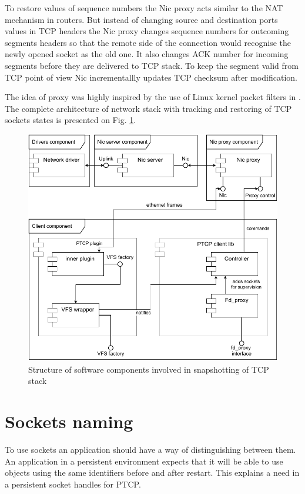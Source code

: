 To restore values of sequence numbers the Nic proxy acts similar to the NAT
mechanism in routers. But instead of changing source and destination ports
values in TCP headers the Nic proxy changes sequence numbers for outcoming
segments headers so that the remote side of the connection would recognise the
newly opened socket as the old one. It also changes ACK number for incoming
segments before they are delivered to TCP stack. To keep the segment valid from
TCP point of view Nic incrementallly updates TCP checksum after modification. 

The idea of proxy was highly inspired by the use of Linux kernel packet filters
in \cite{rocks_racks}. The complete architecture of network stack with tracking
and restoring of TCP sockets states is presented on Fig.
\ref{fig:track_components}.

\begin{figure}
    \centering
    \includegraphics[]{figs/tracking_tcp_stack.pdf}
    \caption{Structure of software components involved in snapshotting of TCP stack}
    \label{fig:track_components}
\end{figure}

\section{Sockets naming}

To use sockets an application should have a way of distinguishing between them.
An application in a persistent environment expects that it will be able to use
objects using the same identifiers before and after restart. This explains a
need in a persistent socket handles for PTCP.

